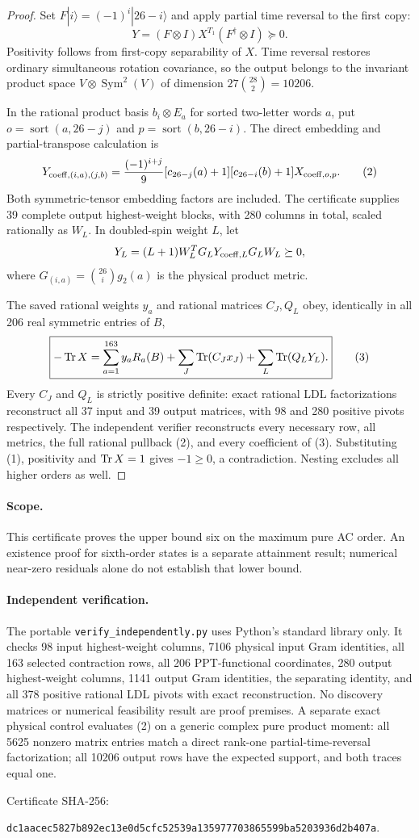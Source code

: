 \documentclass[11pt]{article}
\begin{document}
\begin{proof}
Set $F|i\rangle=(-1)^i|26-i\rangle$ and apply partial time reversal to the first copy:
\[
 Y=(F\otimes I)X^{T_1}(F^\dagger\otimes I)\succeq0.
\]
Positivity follows from first-copy separability of $X$. Time reversal restores ordinary simultaneous rotation covariance, so the output belongs to the invariant product space $V\otimes\operatorname{Sym}^2(V)$ of dimension $27\binom{28}{2}=10206$.

In the rational product basis $b_i\otimes E_a$ for sorted two-letter words $a$, put
$o=\operatorname{sort}(a,26-j)$ and $p=\operatorname{sort}(b,26-i)$. The direct embedding and partial-transpose calculation is
\[
Y_{{\rm coeff},(i,a),(j,b)}=
\frac{(-1)^{i+j}}9[c_{26-j}(a)+1][c_{26-i}(b)+1]X_{{\rm coeff},o,p}. \tag{2}
\]
Both symmetric-tensor embedding factors are included. The certificate supplies 39 complete output highest-weight blocks, with 280 columns in total, scaled rationally as $W_L$. In doubled-spin weight $L$, let
\[
 Y_L=(L+1)W_L^TG_LY_{{\rm coeff},L}G_LW_L\succeq0,
\]
where $G_{(i,a)}=\binom{26}{i}g_2(a)$ is the physical product metric.

The saved rational weights $y_a$ and rational matrices $C_J,Q_L$ obey, identically in all 206 real symmetric entries of $B$,
\[
\boxed{-\operatorname{Tr} X=\sum_{a=1}^{163}y_aR_a(B)+\sum_J\operatorname{Tr}(C_Jx_J)+\sum_L\operatorname{Tr}(Q_LY_L).} \tag{3}
\]
Every $C_J$ and $Q_L$ is strictly positive definite: exact rational LDL factorizations reconstruct all 37 input and 39 output matrices, with 98 and 280 positive pivots respectively. The independent verifier reconstructs every necessary row, all metrics, the full rational pullback (2), and every coefficient of (3). Substituting (1), positivity and $\operatorname{Tr} X=1$ gives $-1\ge0$, a contradiction. Nesting excludes all higher orders as well.
\end{proof}
\paragraph{Scope.}
This certificate proves the upper bound six on the maximum pure AC order. An existence proof for sixth-order states is a separate attainment result; numerical near-zero residuals alone do not establish that lower bound.
\paragraph{Independent verification.}
The portable \texttt{verify\_independently.py} uses Python's standard library only. It checks 98 input highest-weight columns, 7106 physical input Gram identities, all 163 selected contraction rows, all 206 PPT-functional coordinates, 280 output highest-weight columns, 1141 output Gram identities, the separating identity, and all 378 positive rational LDL pivots with exact reconstruction. No discovery matrices or numerical feasibility result are proof premises. A separate exact physical control evaluates (2) on a generic complex pure product moment: all 5625 nonzero matrix entries match a direct rank-one partial-time-reversal factorization; all 10206 output rows have the expected support, and both traces equal one.

Certificate SHA-256:
\begin{center}\small\texttt{dc1aacec5827b892ec13e0d5cfc52539a135977703865599ba5203936d2b407a}.\end{center}
\end{document}
